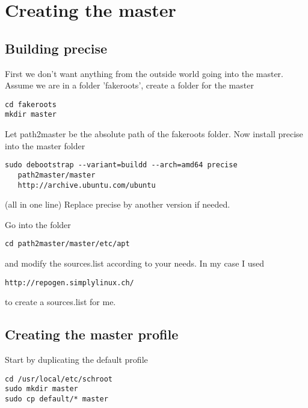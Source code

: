 \documentclass[a4paper]{book}
\begin{document}

\section{Creating the master}
\subsection{Building precise}
First we don't want anything from the outside world going into the master.
Assume we are in a folder 'fakeroots', create a folder for the master

\begin{verbatim}
cd fakeroots
mkdir master
\end{verbatim}

Let path2master be the absolute path of the fakeroots folder.
Now install precise into the master folder

\begin{verbatim}
sudo debootstrap --variant=buildd --arch=amd64 precise 
   path2master/master 
   http://archive.ubuntu.com/ubuntu
\end{verbatim}

(all in one line)
Replace precise by another version if needed.

Go into the folder

\begin{verbatim}
cd path2master/master/etc/apt
\end{verbatim}

and modify the sources.list according to your needs. In my case I used

\begin{verbatim}
http://repogen.simplylinux.ch/
\end{verbatim}

to create a sources.list for me.
\subsection{Creating the master profile}

Start by duplicating the default profile

\begin{verbatim}
cd /usr/local/etc/schroot
sudo mkdir master
sudo cp default/* master
\end{verbatim}
\end{document}
